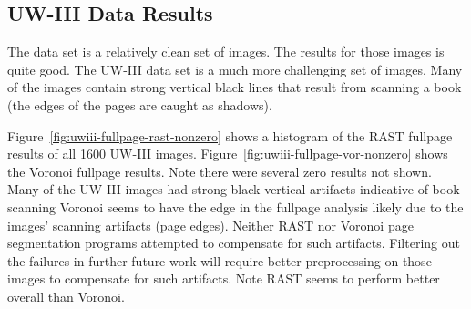 \documentclass[conference]{IEEEtran}
\begin{document}


%
%
\subsection{UW-III Data Results}

The \cite{winder2010extending} data set is a relatively clean set of images. The results for
those images is quite good. The UW-III data set is a much more challenging set
of images. Many of the images contain strong vertical black lines that result
from scanning a book (the edges of the pages are caught as shadows). 

Figure~\ref{fig:uwiii-fullpage-rast-nonzero} shows a histogram of the RAST fullpage results of
all 1600 UW-III images.  Figure~\ref{fig:uwiii-fullpage-vor-nonzero} shows the Voronoi
fullpage results. Note there were several zero results not shown. Many of the
UW-III images had strong black vertical artifacts indicative of book scanning
Voronoi seems to have the edge in the fullpage analysis likely due to the
images' scanning artifacts  (page edges). Neither RAST nor Voronoi page
segmentation programs attempted to compensate for such artifacts. Filtering out
the failures in further future work will require better preprocessing on those
images to compensate for such artifacts. Note RAST seems to perform better
overall than Voronoi.





\end{document}

